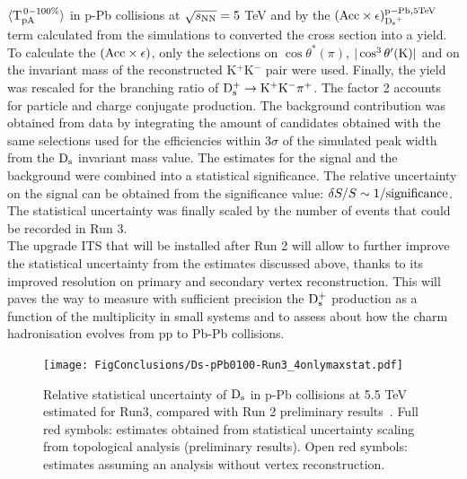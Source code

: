 $\langle {\rm T}_{\rm pA}^{\rm \,0-100\%}\rangle$ in p-Pb collisions at  $\sqrt{s_{\rm NN}}=5$ TeV and by the $({\rm Acc\times \epsilon})_{{\rm D_s}^+}^{\rm p-Pb, 5 TeV}$ term calculated from the simulations to converted the cross section into a yield. To calculate the $({\rm Acc\times \epsilon})$, only 
the selections on $\cos \theta^*(\pi)$, $|\cos^3 \theta^\prime({\rm K})|$ and on the
invariant mass of the reconstructed K$^+$K$^-$ pair were used. Finally, the yield was rescaled for the 
branching ratio of ${\rm D^{+}_\mathrm{s}\to K^+ K^-\pi^+}$. The factor 2 accounts for particle and charge conjugate production.
The background contribution was obtained from data by integrating the amount of candidates 
obtained with the same selections used for the efficiencies within 3$\sigma$ of the simulated 
peak width from the ${\rm D_s}$ invariant mass value. The estimates for the signal and the background
were combined into a statistical significance. The relative uncertainty on the signal can be obtained 
from the significance value: $\delta S/S \sim 1/{\rm significance}$. The statistical uncertainty was finally scaled
by the number of events that could be recorded in Run 3.\\



The upgrade ITS that will be installed after Run 2 will allow to further improve the statistical uncertainty from 
the estimates discussed above, thanks to its improved resolution on primary and secondary vertex reconstruction.
This will paves the way to measure with sufficient precision the ${\rm D_s^+}$ production as a function of the multiplicity
in small systems and to assess about how the charm hadronisation evolves from pp to Pb-Pb collisions.

\begin{figure}[h]
\centering
 \texttt{[image: FigConclusions/Ds-pPb0100-Run3\_4onlymaxstat.pdf]}
 \caption{Relative statistical uncertainty of ${\rm D_s}$ in p-Pb collisions at 5.5 TeV estimated for Run3, compared with Run 2 preliminary results~\cite{ALICE-PUBLIC-2017-008}. Full red symbols: estimates obtained from statistical uncertainty scaling from topological analysis (preliminary results). Open red symbols: estimates assuming an analysis without vertex reconstruction.}
 \label{fig:DsEstimatespPb}
\end{figure}



